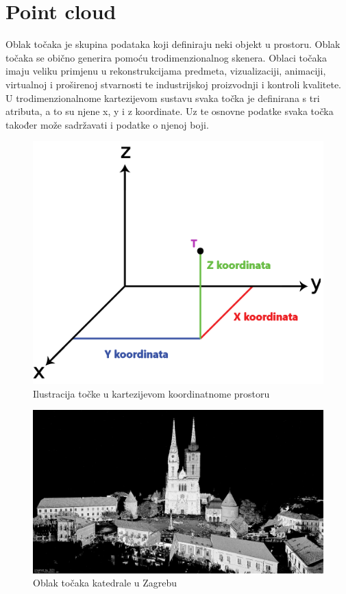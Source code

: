 \section{Point cloud}

Oblak točaka je skupina podataka koji definiraju neki objekt u prostoru. Oblak točaka se obično generira pomoću trodimenzionalnog skenera. Oblaci točaka imaju veliku primjenu u rekonstrukcijama predmeta, vizualizaciji, animaciji, virtualnoj i proširenoj stvarnosti te industrijskoj proizvodnji i kontroli kvalitete. U trodimenzionalnome kartezijevom sustavu svaka točka je definirana s tri atributa, a to su njene x, y i z koordinate. Uz te osnovne podatke svaka točka također može sadržavati i podatke o njenoj boji.

\begin{figure}[ht!]
  \centering
  \includegraphics[scale=0.3]{images/point-coordinates.png}
  \caption{Ilustracija točke u kartezijevom koordinatnome prostoru}
  \label{fig:point_coordinates}
\end{figure}

\begin{figure}[ht!]
  \centering
  \includegraphics[scale=0.2]{images/katedrala-point-cloud.jpg}
  \caption{Oblak točaka katedrale u Zagrebu}
  \label{fig:point_cloud_exmaple}
\end{figure}

